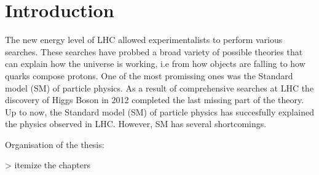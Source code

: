 \chapter{Introduction}
The new energy level of LHC allowed experimentalists to perform various searches.
These searches have probbed a broad variety of possible theories that can explain how the universe is working, i.e
from how objects are falling to how quarks compose protons.
One of the most promissing ones was the Standard model (SM) of particle physics. As a result of comprehensive searches at LHC
the discovery of Higgs Boson in 2012 completed the last missing part of the theory.
Up to now, the Standard model (SM) of particle physics has succesfully explained the physics observed in LHC.
However, SM has several shortcomings.



\newpage
Organisation of the thesis:

> itemize the chapters



